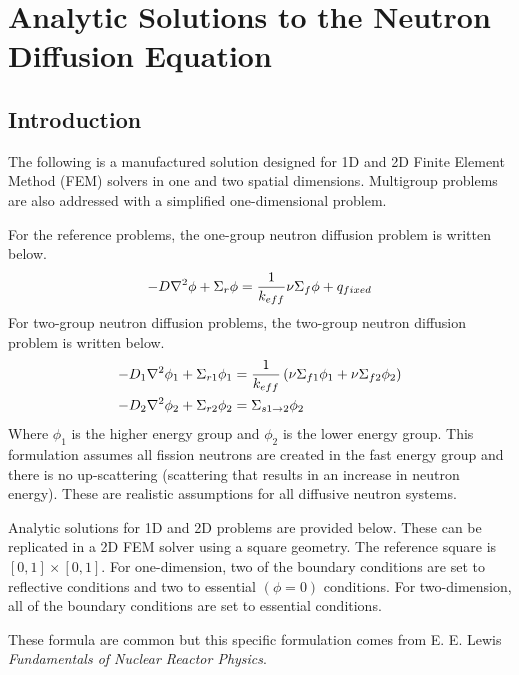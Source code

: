\chapter{Analytic Solutions to the Neutron Diffusion Equation}

\section{Introduction}
  The following is a manufactured solution designed for 1D and 2D Finite Element 
  Method (FEM) solvers in one and two spatial dimensions. Multigroup 
  problems are also addressed with a simplified one-dimensional problem.
  
  For the reference problems, the one-group neutron diffusion problem is written
  below.
  \begin{equation} \label{eq:onegroup}
    -D \mathbf{\nabla}^2 \phi + \Sigma_r \phi =  \frac{1}{k_{eff}} \nu \Sigma_f \phi + 
      q_{fixed}
  \end{equation}
  For two-group neutron diffusion problems, the two-group neutron diffusion 
  problem is written below.
  \begin{align} 
    \label{eq:twogroup1}
    -D_1 \mathbf{\nabla}^2 \phi_1 + \Sigma_{r1} \phi_1 &= \frac{1}{k_{eff}} \left(
      \nu \Sigma_{f1} \phi_1 + \nu \Sigma_{f2} \phi_2 \right) \\
    \label{eq:twogroup2}
    -D_2 \mathbf{\nabla}^2 \phi_2 + \Sigma_{r2} \phi_2 &= 
      \Sigma_{s 1 \rightarrow 2} \phi_2
  \end{align}
  Where $\phi_1$ is the higher energy group and $\phi_2$ is the lower energy 
  group. This formulation assumes all fission neutrons are created in the fast 
  energy group and there is no up-scattering (scattering that results in an 
  increase in neutron energy). These are realistic assumptions for all diffusive
  neutron systems.

  Analytic solutions for 1D and 2D problems are provided below. These can be 
  replicated in a 2D FEM solver using a square geometry. The reference square is 
  $[0,1]\times[0,1]$. For one-dimension, two of the boundary conditions are set
  to reflective conditions and two to essential $(\phi = 0)$ conditions. For 
  two-dimension, all of the boundary conditions are set to essential conditions.
  
  These formula are common but this specific formulation comes from E. E. Lewis
  \textit{Fundamentals of Nuclear Reactor Physics}.

